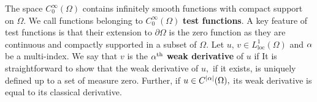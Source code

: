 The space $C_0^\infty(\Omega)$ contains infinitely smooth functions with compact support on $\Omega.$ We call functions belonging to $C_0^\infty(\Omega)$ \textbf{test functions}. A key feature of test functions is that their extension to $\partial\Omega$ is the zero function as they are continuous and compactly supported in a subset of $\Omega.$ Let $u,\,v\in L^1_{\mathrm{loc}}(\Omega)$ and $\alpha$ be a multi-index. We say that $v$ is the $\alpha^\mathrm{th}$ \textbf{weak derivative} of $u$ if
It is straightforward to show that the weak derivative of $u,$ if it exists, is uniquely defined up to a set of measure zero. Further, if $u\in C^\abs{\alpha}(\Omega),$ its weak derivative is equal to its classical derivative.

